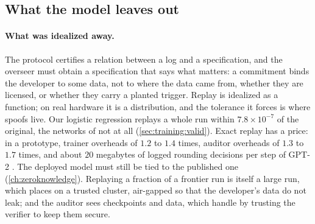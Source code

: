 \begin{refsection}

\section{What the model leaves out}\label{sec:training:leaves}

\paragraph{What was idealized away.} The protocol certifies a relation between a log and a specification, and the overseer must obtain a specification that says what matters: a commitment binds the developer to some data, not to where the data came from, whether they are licensed, or whether they carry a planted trigger. Replay is idealized as a function; on real hardware it is a distribution, and the tolerance it forces is where spoofs live. Our logistic regression replays a whole run within $7.8\times10^{-7}$ of the original, the networks of \textcite{JiaEtAl2021} not at all (\cref{sec:training:valid}). Exact replay has a price: in a prototype, trainer overheads of $1.2$ to $1.4$ times, auditor overheads of $1.3$ to $1.7$ times, and about $20$ megabytes of logged rounding decisions per step of GPT-2 \parencite{SrivastavaAroraBoneh2024}. The deployed model must still be tied to the published one (\cref{ch:zeroknowledge}). Replaying a fraction of a frontier run is itself a large run, which \textcite{Shavit2023} places on a trusted cluster, air-gapped so that the developer's data do not leak; and the auditor sees checkpoints and data, which \textcite{ChoiShavitDuvenaud2023} handle by trusting the verifier to keep them secure.


\end{refsection}
